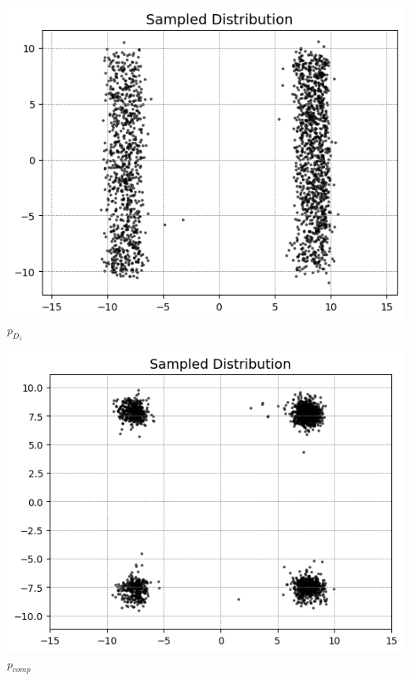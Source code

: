 \documentclass{article}
\begin{document}
\begin{center}
  \begin{minipage}{0.4\textwidth}
    \includegraphics[width=\linewidth]{images_guidance1/model1foraddedscores.png}
    \centering\small $p_{D_1}$
  \end{minipage}
  \hfill
  \begin{minipage}{0.4\textwidth}
    \includegraphics[width=\linewidth]{images_guidance1/addedscores1.png}
    \centering\small $p_{comp}$
  \end{minipage}
  \hfill
  \end{center}
\end{document}
